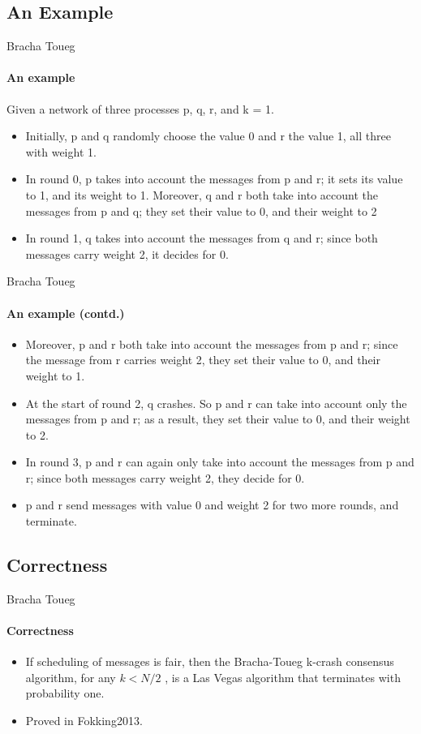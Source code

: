 \documentclass[11pt]{beamer}              %
\begin{document}
\subsection{An Example}
\begin{frame}{Bracha Toueg}
\framesubtitle{An example}
Given a network of three processes p, q, r, and k = 1.

\begin{itemize}
\item Initially, p and q randomly choose the value 0 and r the value 1, all three with weight 1.
\item In round 0, p takes into account the messages from p and r; it sets its value to 1, and its weight to 1. Moreover, q and r both take into account the messages from p and q; they set their value to 0, and their weight to 2
\item  In round 1, q takes into account the messages from q and r; since both messages carry weight 2, it decides for 0.
\end{itemize}
\end{frame}


\begin{frame}{Bracha Toueg}
\framesubtitle{An example (contd.)}
\begin{itemize}
\item Moreover, p and r both take into account the messages from p and r; since the message from r carries weight 2, they set their value to 0, and their weight to 1.
\item At the start of round 2, q crashes. So p and r can take into account only the messages from p and r; as a result, they set their value to 0, and their weight to 2.
\item In round 3, p and r can again only take into account the messages from p and r; since both messages carry weight 2, they decide for 0.
\item p and r send messages with value 0 and weight 2 for two more rounds, and terminate.
\end{itemize}

\end{frame}

\subsection{Correctness}
\begin{frame}{Bracha Toueg}
\framesubtitle{Correctness}
\begin{itemize}
\item If scheduling of messages is fair, then the Bracha-Toueg k-crash consensus algorithm, for any \(k < N/2\) , is a Las Vegas
algorithm that terminates with probability one.
\item Proved in \cite{Fokking2013}\alert{Fokking2013}.
\end{itemize}
\end{frame}
\end{document}
